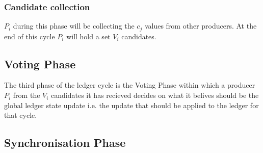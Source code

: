\documentclass{article}
\begin{document}
\subsubsection{Candidate collection}

$P_i$ during this phase will be collecting the $c_j$ values from other producers. At the end of this cycle $P_i$ will hold a set $V_i$ candidates.



\subsection{Voting Phase}

The third phase of the ledger cycle is the Voting Phase within which a producer $P_i$ from the $V_i$ candidates it has recieved decides on what it belives should be the global ledger state update i.e. the update that should be applied to the ledger for that cycle. 



\subsection{Synchronisation Phase}



\end{document}
